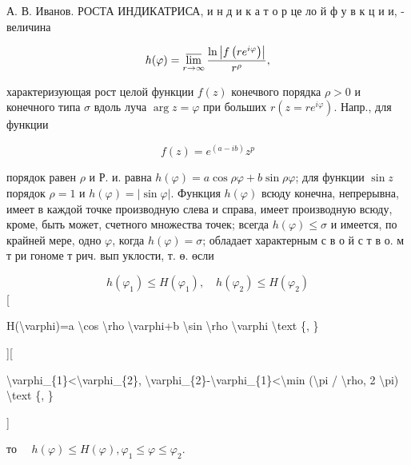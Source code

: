 \documentclass[10pt]{article}
\begin{document}
А. В. Иванов. РОСТА ИНДИКАТРИСА, и н д и к а т о р це ло й ф у в к ц и и, - величина



\[

h(\varphi)=\varlimsup_{r \rightarrow \infty} \frac{\ln \left|f\left(r e^{i \varphi}\right)\right|}{r^{\rho}},

\]



характеризующая рост целой функции $f(z)$ конечвого порядка $\rho>0$ и конечного типа $\sigma$ вдоль луча $\arg z=\varphi$ при больших $r\left(z=r e^{i \varphi}\right)$. Напр., для функции



\[

f(z)=e^{(a-i b)} z^{p}

\]



порядок равен $\rho$ и Р. и. равна $h(\varphi)=a \cos \rho \varphi+b \sin \rho \varphi$; для функции $\sin z$ порядок $\rho=1$ и $h(\varphi)=|\sin \varphi|$. Функция $h(\varphi)$ всюду конечна, непрерывна, имеет в каждой точке производную слева и справа, имеет производную всюду, кроме, быть может, счетного множества точек; всегда $h(\varphi) \leqslant \sigma$ и имеется, по крайней мере, одно $\varphi$, когда $h(\varphi)=\sigma$; обладает характерным с в о й с т в о. м т ри гономе т рич. вып уклости, т. ө. өсли



\[

h\left(\varphi_{1}\right) \leqslant H\left(\varphi_{1}\right), \quad h\left(\varphi_{2}\right) \leqslant H\left(\varphi_{2}\right)

\][



H(\textbackslash varphi)=a \textbackslash cos \textbackslash rho \textbackslash varphi+b \textbackslash sin \textbackslash rho \textbackslash varphi \textbackslash text \{, \}



][



\textbackslash varphi\_\{1\}<\textbackslash varphi\_\{2\}, \textbackslash varphi\_\{2\}-\textbackslash varphi\_\{1\}<\textbackslash min (\textbackslash pi / \textbackslash rho, 2 \textbackslash pi) \textbackslash text \{, \}

]



то $\quad h(\varphi) \leqslant H(\varphi), \varphi_{1} \leqslant \varphi \leqslant \varphi_{2}$.
\end{document}
